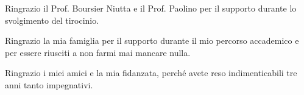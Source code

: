 

Ringrazio il Prof. Boursier Niutta e il Prof. Paolino per il supporto durante lo svolgimento del tirocinio.

\bigskip

Ringrazio la mia famiglia per il supporto durante il mio percorso accademico e per essere riusciti a non farmi mai mancare nulla.

\bigskip

Ringrazio i miei amici e la mia fidanzata, perché avete reso indimenticabili tre anni tanto impegnativi.
\vspace*{5\baselineskip}